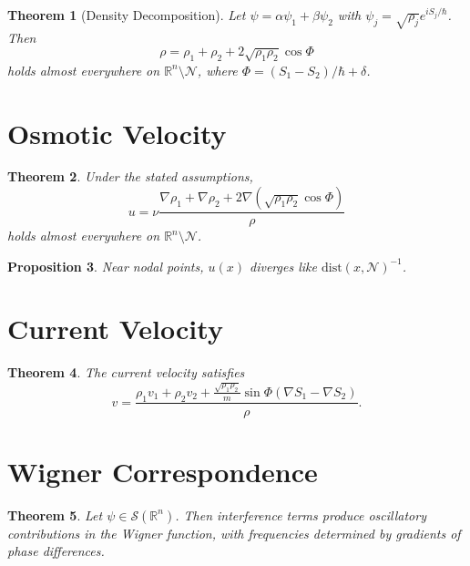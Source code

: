 \documentclass[11pt]{article}
\newtheorem{theorem}{Theorem}[section]
\newtheorem{proposition}[theorem]{Proposition}
\begin{document}
\begin{theorem}[Density Decomposition]
Let $\psi = \alpha \psi_1 + \beta \psi_2$ with $\psi_j = \sqrt{\rho_j} e^{iS_j/\hbar}$. Then
\begin{equation}
\rho = \rho_1 + \rho_2 + 2\sqrt{\rho_1\rho_2}\cos\Phi
\end{equation}
holds almost everywhere on $\mathbb{R}^n \setminus \mathcal{N}$, where $\Phi = (S_1 - S_2)/\hbar + \delta$.
\end{theorem}

\section{Osmotic Velocity}

\begin{theorem}
Under the stated assumptions,
\begin{equation}
u = \nu \frac{\nabla \rho_1 + \nabla \rho_2 + 2\nabla(\sqrt{\rho_1\rho_2}\cos\Phi)}{\rho}
\end{equation}
holds almost everywhere on $\mathbb{R}^n \setminus \mathcal{N}$.
\end{theorem}

\begin{proposition}
Near nodal points, $u(x)$ diverges like $\mathrm{dist}(x,\mathcal{N})^{-1}$.
\end{proposition}

\section{Current Velocity}

\begin{theorem}
The current velocity satisfies
\begin{equation}
v = \frac{\rho_1 v_1 + \rho_2 v_2 + \frac{\sqrt{\rho_1\rho_2}}{m} \sin\Phi (\nabla S_1 - \nabla S_2)}{\rho}.
\end{equation}
\end{theorem}

\section{Wigner Correspondence}

\begin{theorem}
Let $\psi \in \mathcal{S}(\mathbb{R}^n)$. Then interference terms produce oscillatory contributions in the Wigner function, with frequencies determined by gradients of phase differences.
\end{theorem}
\end{document}
